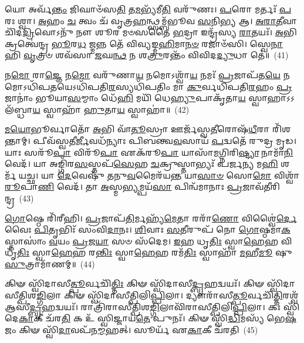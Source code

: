 {\anuvakamend[{\-\ul{𑌅}\-𑌦𑍍𑌭𑍍𑌯 𑌏\-\ul{𑌕𑌾}\-𑌨𑍍𑌨\-\ul{𑌤𑍍𑌰𑌿}\-\-\ul{𑍞}\-𑌶𑌤𑍍}]}%

𑌯𑍋 𑌅𑌰𑍍𑌵᳴\-\ul{𑌨𑍍𑌤𑌂} 𑌜𑌿𑌘𑌾𑍞᳴𑌸\-\ul{𑌤𑌿} 𑌤\-\ul{𑌮}\-𑌭𑍍𑌯᳴𑌮𑍀\-\ul{𑌤𑌿} 𑌵𑌰𑍁᳴𑌣𑌃। \ul{𑌪}\-𑌰𑍋 𑌮𑌰𑍍𑌤𑌃᳴ \ul{𑌪}\-𑌰𑌃 𑌶𑍍𑌵𑌾। \ul{𑌅}\-𑌹𑌂 \ul{𑌚} 𑌤𑍍𑌵𑌂 𑌚᳴ 𑌵𑍃𑌤𑍍𑌰\-\ul{𑌹}\-𑌨𑍍𑌥𑍍𑌸𑌮𑍍𑌬᳴𑌭𑍂𑌵 \ul{𑌸}\-𑌨𑌿\-\ul{𑌭𑍍𑌯} 𑌆। \ul{𑌅}\-\-\ul{𑌰𑌾}\-\-\ul{𑌤𑍀}\-𑌵𑌾 𑌚𑌿᳴𑌦\-\ul{𑌦𑍍𑌰𑌿}\-𑌵𑍋\-𑌽𑌨𑍁᳴ 𑌨𑍗 𑌶𑍂𑌰 𑌮𑍞𑌸𑌤𑍈 \ul{𑌭}\-𑌦𑍍𑌰𑌾 𑌇𑌨𑍍𑌦𑍍𑌰᳴𑌸𑍍𑌯 \ul{𑌰𑌾}\-𑌤𑌯𑌃᳴। \ul{𑌅}\-𑌭𑌿 𑌕𑍍𑌰𑌤𑍍𑌵𑍇॑𑌨𑍍𑌦𑍍𑌰 \ul{𑌭𑍂}\-𑌰\-\ul{𑌧} 𑌜𑍍𑌮𑌨𑍍𑌨 𑌤𑍇᳴ 𑌵𑌿𑌵𑍍𑌯𑌙𑍍𑌮\-\ul{𑌹𑌿}\-𑌮𑌾\-\ul{𑌨}\-\-\ul{𑍞} 𑌰𑌜𑌾𑍞᳴𑌸𑌿। 𑌸𑍍𑌵𑍇\-\ul{𑌨𑌾} 𑌹𑌿 \ul{𑌵𑍃}\-𑌤𑍍𑌰𑍞 𑌶𑌵᳴𑌸𑌾 \ul{𑌜}\-𑌘\-\ul{𑌨𑍍𑌥} 𑌨 𑌶\-\ul{𑌤𑍍𑌰𑍁}\-𑌰𑌨𑍍𑌤𑌂᳴ 𑌵𑌿𑌵𑌿𑌦\-\ul{𑌦𑍍𑌯𑍁}\-𑌧𑌾 𑌤𑍇॑॥~(41)

{\anuvakamend[{\-\ul{𑌵𑌿}\-\-\ul{𑌵𑌿}\-𑌦𑌦𑍍𑌦𑍍𑌵𑍇 𑌚᳴}]}%

𑌨\-\ul{𑌮𑍋} 𑌰𑌾\-\ul{𑌜𑍍𑌞𑍇} 𑌨\-\ul{𑌮𑍋} 𑌵𑌰𑍁᳴𑌣𑌾\-\ul{𑌯} 𑌨𑌮𑍋\-𑌽𑌶𑍍𑌵𑌾᳴\-\ul{𑌯} 𑌨𑌮𑌃᳴ \ul{𑌪𑍍𑌰}\-𑌜𑌾𑌪᳴𑌤\-\ul{𑌯𑍇} 𑌨𑌮𑍋\-𑌽𑌧𑌿᳴𑌪\-\ul{𑌤}\-𑌯𑍇\-𑌽𑌧𑌿᳴𑌪𑌤𑌿\-\ul{𑌰}\-𑌸𑍍𑌯𑌧𑌿᳴𑌪𑌤𑌿𑌂 𑌮𑌾 \ul{𑌕𑍁}\-𑌰𑍍𑌵𑌧𑌿᳴𑌪𑌤𑌿\-\ul{𑌰}\-𑌹𑌂 \ul{𑌪𑍍𑌰}\-𑌜𑌾𑌨𑌾𑌂॑ 𑌭𑍂𑌯𑌾\-\ul{𑌸}\-𑌮𑍍𑌮𑌾𑌂 𑌧𑍇᳴\-\ul{𑌹𑌿} 𑌮𑌯𑌿᳴ 𑌧𑍇\-\ul{𑌹𑍍𑌯𑍁}\-𑌪𑌾𑌕𑍃᳴𑌤𑌾\-\ul{𑌯} 𑌸𑍍𑌵𑌾𑌹𑌾\-𑌽\-𑌽𑌲᳴𑌬𑍍𑌧𑌾\-\ul{𑌯} 𑌸𑍍𑌵𑌾𑌹𑌾᳴ \ul{𑌹𑍁}\-𑌤𑌾\-\ul{𑌯} 𑌸𑍍𑌵𑌾𑌹𑌾॑॥~(42)

{\anuvakamend[{𑌨\-\ul{𑌮} 𑌏\-\ul{𑌕𑌾}\-𑌨𑍍𑌨\-\ul{𑌤𑍍𑌰𑌿}\-\-\ul{𑍞}\-𑌶𑌤𑍍}]}%

\-\ul{𑌮}\-\-\ul{𑌯𑍋}\-𑌭𑍂𑌰𑍍𑌵𑌾𑌤𑍋᳴ \ul{𑌅}\-𑌭𑌿 𑌵𑌾᳴\-\ul{𑌤𑍂}\-𑌸𑍍𑌰𑌾 𑌊𑌰𑍍𑌜᳴𑌸𑍍𑌵\-\ul{𑌤𑍀}\-𑌰𑍋𑌷᳴\-\ul{𑌧𑍀}\-𑌰𑌾 𑌰𑌿᳴𑌶𑌨𑍍𑌤𑌾𑌮𑍍। 𑌪𑍀𑌵᳴𑌸𑍍𑌵𑌤𑍀\-\ul{𑌰𑍍𑌜𑍀}\-𑌵𑌧᳴𑌨𑍍𑌯𑌾𑌃 𑌪𑌿𑌬𑌨𑍍𑌤𑍍𑌵\-\ul{𑌵}\-𑌸𑌾𑌯᳴ \ul{𑌪}\-𑌦𑍍𑌵𑌤𑍇᳴ 𑌰𑍁𑌦𑍍𑌰 𑌮𑍃𑌡। 𑌯𑌾𑌃 𑌸𑌰𑍂᳴\-\ul{𑌪𑌾} 𑌵𑌿𑌰𑍂᳴\-\ul{𑌪𑌾} 𑌏𑌕᳴𑌰𑍂\-\ul{𑌪𑌾} 𑌯𑌾𑌸𑌾᳴\-\ul{𑌮}\-𑌗𑍍𑌨𑌿𑌰𑌿\-\ul{𑌷𑍍𑌟𑍍𑌯𑌾} 𑌨𑌾𑌮𑌾᳴\-\ul{𑌨𑌿} 𑌵𑍇𑌦᳴। 𑌯𑌾 𑌅𑌙𑍍𑌗𑌿᳴𑌰\-\ul{𑌸}\-𑌸𑍍𑌤𑌪᳴\-\ul{𑌸𑍇}\-𑌹 \ul{𑌚}\-𑌕𑍍𑌰𑍁𑌸𑍍𑌤𑌾𑌭𑍍𑌯𑌃᳴ 𑌪𑌰𑍍𑌜\-\ul{𑌨𑍍𑌯} 𑌮\-\ul{𑌹𑌿} 𑌶𑌰𑍍𑌮᳴ 𑌯𑌚𑍍𑌛। 𑌯𑌾 \ul{𑌦𑍇}\-𑌵𑍇𑌷𑍁᳴ \ul{𑌤}\-𑌨𑍁\-\ul{𑌵}\-𑌮𑍈𑌰᳴𑌯\-\ul{𑌨𑍍𑌤} 𑌯𑌾\-\ul{𑌸𑌾}\-\-\ul{𑍞} 𑌸𑍋\-\ul{𑌮𑍋} 𑌵𑌿𑌶𑍍𑌵𑌾᳴ \ul{𑌰𑍂}\-𑌪𑌾\-\ul{𑌣𑌿} 𑌵𑍇𑌦᳴। 𑌤𑌾 \ul{𑌅}\-𑌸𑍍𑌮\-\ul{𑌭𑍍𑌯}\-𑌮𑍍𑌪𑌯᳴\-\ul{𑌸𑌾} 𑌪𑌿𑌨𑍍𑌵᳴𑌮𑌾𑌨𑌾𑌃 \ul{𑌪𑍍𑌰}\-𑌜𑌾𑌵᳴𑌤𑍀𑌰𑌿𑌨𑍍𑌦𑍍𑌰~(43)

\-\ul{𑌗𑍋}\-𑌷𑍍𑌠𑍇 𑌰𑌿᳴𑌰𑍀𑌹𑌿। \ul{𑌪𑍍𑌰}\-𑌜𑌾𑌪᳴\-\ul{𑌤𑌿}\-𑌰𑍍𑌮𑌹𑍍𑌯᳴\-\ul{𑌮𑍇}\-𑌤𑌾 𑌰𑌰𑌾᳴\-\ul{𑌣𑍋} 𑌵𑌿𑌶𑍍𑌵𑍈॑\-\ul{𑌰𑍍𑌦𑍇}\-𑌵𑍈𑌃 \ul{𑌪𑌿}\-𑌤𑍃𑌭𑌿𑌃᳴ 𑌸𑌂𑌵𑌿\-\ul{𑌦𑌾}\-𑌨𑌃। \ul{𑌶𑌿}\-𑌵𑌾𑌃 \ul{𑌸}\-𑌤𑍀𑌰𑍁𑌪᳴ 𑌨𑍋 \ul{𑌗𑍋}\-𑌷𑍍𑌠𑌮𑌾\-\ul{𑌕}\-𑌸𑍍𑌤𑌾𑌸𑌾𑌂॑ \ul{𑌵}\-𑌯𑌂 \ul{𑌪𑍍𑌰}\-𑌜\-\ul{𑌯𑌾} 𑌸𑍞 𑌸᳴𑌦𑍇𑌮। \ul{𑌇}\-𑌹 𑌧𑍃\-\ul{𑌤𑌿𑌃} 𑌸𑍍𑌵𑌾\-\ul{𑌹𑍇}\-𑌹 𑌵𑌿𑌧𑍃᳴\-\ul{𑌤𑌿𑌃} 𑌸𑍍𑌵𑌾\-\ul{𑌹𑍇}\-𑌹 𑌰\-\ul{𑌨𑍍𑌤𑌿𑌃} 𑌸𑍍𑌵𑌾\-\ul{𑌹𑍇}\-𑌹 𑌰𑌮᳴\-\ul{𑌤𑌿𑌃} 𑌸𑍍𑌵𑌾𑌹𑌾᳴ \ul{𑌮}\-𑌹𑍀\-\ul{𑌮𑍂} 𑌷𑍁 \ul{𑌸𑍁}\-𑌤𑍍𑌰𑌾𑌮𑌾᳴𑌣𑌮𑍍॥~(44)

{\anuvakamend[{\-\ul{𑌇}\-\-\ul{𑌨𑍍𑌦𑍍𑌰𑌾}\-𑌷𑍍𑌟𑌾𑌤𑍍𑌰𑌿𑍞᳴𑌶𑌚𑍍𑌚}]}%

𑌕𑌿𑍟 𑌸𑍍𑌵𑌿᳴𑌦𑌾𑌸𑍀\-\ul{𑌤𑍍𑌪𑍂}\-𑌰𑍍𑌵𑌚𑌿᳴\-\ul{𑌤𑍍𑌤𑌿𑌃} 𑌕𑌿𑍟 𑌸𑍍𑌵𑌿᳴𑌦𑌾𑌸𑍀\-\ul{𑌦𑍍𑌬𑍃}\-𑌹𑌦𑍍𑌵𑌯𑌃᳴। 𑌕𑌿𑍟 𑌸𑍍𑌵𑌿᳴𑌦𑌾𑌸𑍀𑌤𑍍𑌪𑌿𑌶\-\ul{𑌙𑍍𑌗𑌿}\-𑌲𑌾 𑌕𑌿𑍟 𑌸𑍍𑌵𑌿᳴𑌦𑌾𑌸𑍀𑌤𑍍𑌪𑌿𑌲𑌿\-\ul{𑌪𑍍𑌪𑌿}\-𑌲𑌾। 𑌦𑍍𑌯𑍗𑌰𑌾᳴𑌸𑍀\-\ul{𑌤𑍍𑌪𑍂}\-𑌰𑍍𑌵𑌚𑌿᳴\-\ul{𑌤𑍍𑌤𑌿}\-𑌰𑌶𑍍𑌵᳴ 𑌆𑌸𑍀\-\ul{𑌦𑍍𑌬𑍃}\-𑌹𑌦𑍍𑌵𑌯𑌃᳴। 𑌰𑌾𑌤𑍍𑌰𑌿᳴𑌰𑌾𑌸𑍀𑌤𑍍𑌪𑌿𑌶\-\ul{𑌙𑍍𑌗𑌿}\-𑌲𑌾𑌵𑌿᳴𑌰𑌾𑌸𑍀𑌤𑍍𑌪𑌿𑌲𑌿\-\ul{𑌪𑍍𑌪𑌿}\-𑌲𑌾। 𑌕𑌃 𑌸𑍍𑌵𑌿᳴𑌦𑍇\-\ul{𑌕𑌾}\-𑌕𑍀 𑌚᳴𑌰\-\ul{𑌤𑌿} 𑌕 𑌉᳴ 𑌸𑍍𑌵𑌿𑌜𑍍𑌜𑌾𑌯\-\ul{𑌤𑍇} 𑌪𑍁𑌨𑌃᳴। 𑌕𑌿𑍟 𑌸𑍍𑌵𑌿᳴\-\ul{𑌦𑍍𑌧𑌿}\-𑌮𑌸𑍍𑌯᳴ 𑌭𑍇\-\ul{𑌷}\-𑌜𑌂 𑌕𑌿𑍟 𑌸𑍍𑌵𑌿᳴\-\ul{𑌦𑌾}\-𑌵𑌪᳴𑌨\-\ul{𑌮𑍍𑌮}\-𑌹𑌤𑍍। 𑌸𑍂𑌰𑍍𑌯᳴ 𑌏\-\ul{𑌕𑌾}\-𑌕𑍀 𑌚᳴𑌰𑌤𑌿~(45)

